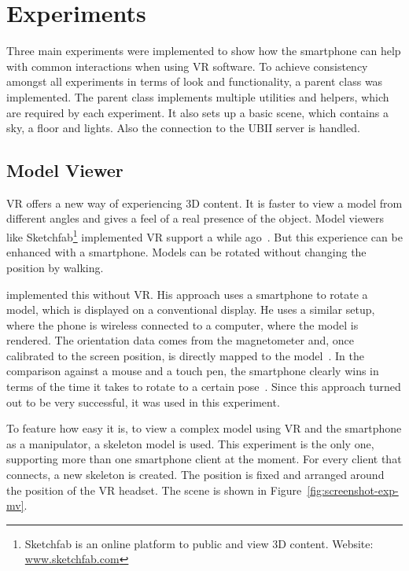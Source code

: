\section{Experiments}\label{section:experiments}

Three main experiments were implemented to show how the smartphone can help with common interactions when using \ac{VR} software.
To achieve consistency amongst all experiments in terms of look and functionality, a parent class was implemented. The parent class implements multiple utilities and helpers, which are required by each experiment. It also sets up a basic scene, which contains a sky, a floor and lights.  Also the connection to the \ac{UBII} server is handled. 


\subsection{Model Viewer}\label{subsection:model-viewer}

\acl{VR} offers a new way of experiencing \ac{3D} content. It is faster to view a model from different angles and gives a feel of a real presence of the object. Model viewers like Sketchfab\footnote{Sketchfab is an online platform to public and view 3D content. Website: \href{https://sketchfab.com}{www.sketchfab.com}} implemented \ac{VR} support a while ago~\cite{AlbanDenoyel.2016}. But this experience can be enhanced with a smartphone. Models can be rotated without changing the position by walking.

\citeauthor{Katzakis.2010} implemented this without \ac{VR}. His approach uses a smartphone to rotate a model, which is displayed on a conventional display. He uses a similar setup, where the phone is wireless connected to a computer, where the model is rendered. The orientation data comes from the magnetometer and, once calibrated to the screen position, is directly mapped to the model~\cite[139]{Katzakis.2010}. In the comparison against a mouse and a touch pen, the smartphone clearly wins in terms of the time it takes to rotate to a certain pose~\cite[140]{Katzakis.2010}. 
Since this approach turned out to be very successful, it was used in this experiment. 

To feature how easy it is, to view a complex model using VR and the smartphone as a manipulator, a skeleton model is used. This experiment is the only one, supporting more than one smartphone client at the moment. For every client that connects, a new skeleton is created. The position is fixed and arranged around the position of the \ac{VR} headset. The scene is shown in Figure~\ref{fig:screenshot-exp-mv}.

